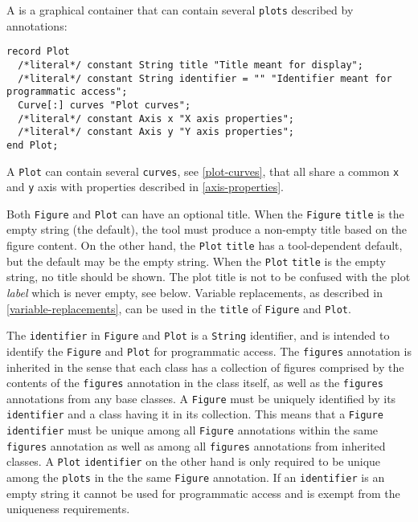 A  is a graphical container that can contain several \lstinline!plots! described by  annotations:
\begin{lstlisting}[language=modelica]
record Plot
  /*literal*/ constant String title "Title meant for display";
  /*literal*/ constant String identifier = "" "Identifier meant for programmatic access";
  Curve[:] curves "Plot curves";
  /*literal*/ constant Axis x "X axis properties";
  /*literal*/ constant Axis y "Y axis properties";
end Plot;
\end{lstlisting}

A \lstinline!Plot! can contain several \lstinline!curves!, see \cref{plot-curves}, that all share a common \lstinline!x! and \lstinline!y! axis with properties described in \cref{axis-properties}.

Both \lstinline!Figure! and \lstinline!Plot! can have an optional title.
When the \lstinline!Figure! \lstinline!title! is the empty string (the default), the tool must produce a non-empty title based on the figure content.
On the other hand, the \lstinline!Plot! \lstinline!title! has a tool-dependent default, but the default may be the empty string.
When the \lstinline!Plot! \lstinline!title! is the empty string, no title should be shown.
The plot title is not to be confused with the plot \emph{label} which is never empty, see below.
Variable replacements, as described in \cref{variable-replacements}, can be used in the \lstinline!title! of \lstinline!Figure! and \lstinline!Plot!.

The \lstinline!identifier! in \lstinline!Figure! and \lstinline!Plot! is a \lstinline!String! identifier, and is intended to identify the \lstinline!Figure! and \lstinline!Plot! for programmatic access.
The \lstinline!figures! annotation is inherited in the sense that each class has a collection of figures comprised by the contents of the \lstinline!figures! annotation in the class itself, as well as the \lstinline!figures! annotations from any base classes.
A \lstinline!Figure! must be uniquely identified by its \lstinline!identifier! and a class having it in its collection.
This means that a \lstinline!Figure! \lstinline!identifier! must be unique among all \lstinline!Figure! annotations within the same \lstinline!figures! annotation as well as among all \lstinline!figures! annotations from inherited classes.
A \lstinline!Plot! \lstinline!identifier! on the other hand is only required to be unique among the \lstinline!plots! in the the same \lstinline!Figure! annotation.
If an \lstinline!identifier! is an empty string it cannot be used for programmatic access and is exempt from the uniqueness requirements.

